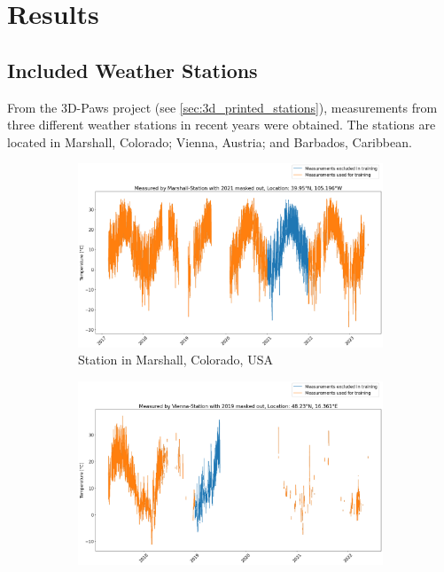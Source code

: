 \section{Results}
\label{sec:results}

\subsection{Included Weather Stations}

From the 3D-Paws project (see \autoref{sec:3d_printed_stations}), measurements from three different weather stations in recent years were obtained. The stations are located in Marshall, Colorado; Vienna, Austria; and Barbados, Caribbean.

\begin{figure}
\centering
\begin{subfigure}{0.672\textwidth}
\includegraphics[width=\textwidth]{resources/images/charts/marshall_available_measurements.png}
\caption{Station in Marshall, Colorado, USA}
\label{fig:available_measurements_marshall}
\end{subfigure}
\begin{subfigure}{0.672\textwidth}
\includegraphics[width=\textwidth]{resources/images/charts/vienna_available_measurements.png}

\end{subfigure}
\end{figure}
